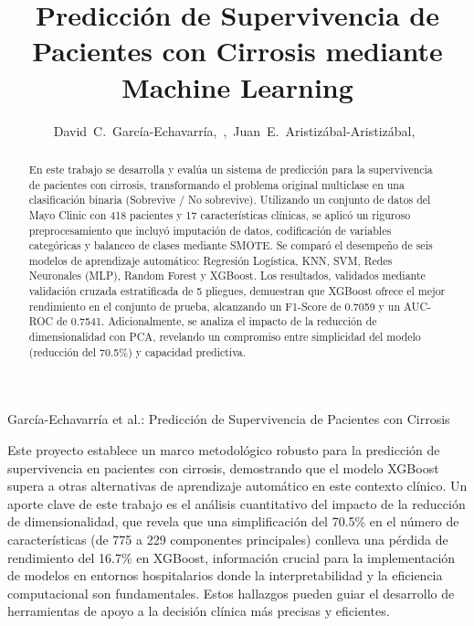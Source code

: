 \documentclass[journal]{IEEEtai}
\begin{document}
\title{Predicción de Supervivencia de Pacientes con Cirrosis mediante Machine Learning}

\author{David~C.~García-Echavarría,~,~Juan~E.~Aristizábal-Aristizábal,~
}

{García-Echavarría \MakeLowercase{et al.}: Predicción de Supervivencia de Pacientes con Cirrosis}

\maketitle

\begin{abstract}
En este trabajo se desarrolla y evalúa un sistema de predicción para la supervivencia de pacientes con cirrosis, transformando el problema original multiclase en una clasificación binaria (Sobrevive / No sobrevive). Utilizando un conjunto de datos del Mayo Clinic con 418 pacientes y 17 características clínicas, se aplicó un riguroso preprocesamiento que incluyó imputación de datos, codificación de variables categóricas y balanceo de clases mediante SMOTE. Se comparó el desempeño de seis modelos de aprendizaje automático: Regresión Logística, KNN, SVM, Redes Neuronales (MLP), Random Forest y XGBoost. Los resultados, validados mediante validación cruzada estratificada de 5 pliegues, demuestran que XGBoost ofrece el mejor rendimiento en el conjunto de prueba, alcanzando un F1-Score de 0.7059 y un AUC-ROC de 0.7541. Adicionalmente, se analiza el impacto de la reducción de dimensionalidad con PCA, revelando un compromiso entre simplicidad del modelo (reducción del 70.5\%) y capacidad predictiva.
\end{abstract}

\begin{IEEEImpStatement}
Este proyecto establece un marco metodológico robusto para la predicción de supervivencia en pacientes con cirrosis, demostrando que el modelo XGBoost supera a otras alternativas de aprendizaje automático en este contexto clínico. Un aporte clave de este trabajo es el análisis cuantitativo del impacto de la reducción de dimensionalidad, que revela que una simplificación del 70.5\% en el número de características (de 775 a 229 componentes principales) conlleva una pérdida de rendimiento del 16.7\% en XGBoost, información crucial para la implementación de modelos en entornos hospitalarios donde la interpretabilidad y la eficiencia computacional son fundamentales. Estos hallazgos pueden guiar el desarrollo de herramientas de apoyo a la decisión clínica más precisas y eficientes.
\end{IEEEImpStatement}
\end{document}
